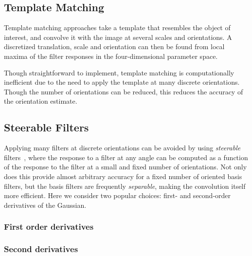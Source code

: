 \documentclass{IEEEtran}
\begin{document}
\subsection{Template Matching}
Template matching approaches take a template that resembles the object of interest, and convolve it with the image at several scales and orientations. A discretized translation, scale and orientation can then be found from local maxima of the filter responses in the four-dimensional parameter space.

%

Though straightforward to implement, template matching is computationally inefficient due to the need to apply the template at many discrete orientations. Though the number of orientations can be reduced, this reduces the accuracy of the orientation estimate.

\subsection{Steerable Filters}
Applying many filters at discrete orientations can be avoided by using \emph{steerable} filters~\cite{Freeman_Adelson_TPAMI91,Koenderink_vanDoorn_TPAMI92}, where the response to a filter at any angle can be computed as a function of the response to the filter at a small and fixed number of orientations. Not only does this provide almost arbitrary accuracy for a fixed number of oriented basis filters, but the basis filters are frequently \emph{separable}, making the convolution itself more efficient. Here we consider two popular choices: first- and second-order derivatives of the Gaussian.

\subsubsection{First order derivatives}
%

%
\subsubsection{Second derivatives}
%
\end{document}
